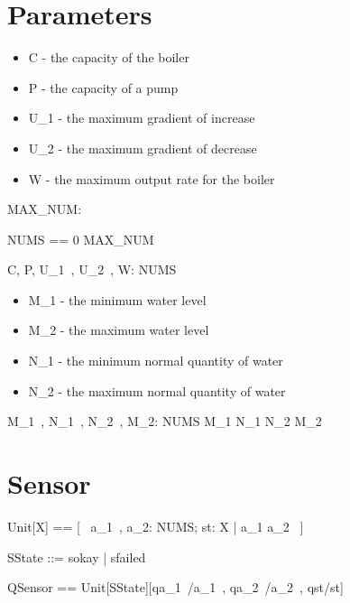 \documentclass{report} %
\begin{document}
\section{Parameters}
\begin{itemize}
    \item C - the capacity of the boiler
    \item P - the capacity of a pump 
    \item U\_1 - the maximum gradient of increase 
    \item U\_2 - the maximum gradient of decrease 
    \item W - the maximum output rate for the boiler 
\end{itemize}

\begin{axdef}
  MAX\_NUM: \nat
\end{axdef}

\begin{zed}
  NUMS == 0 \upto MAX\_NUM
\end{zed}

\begin{axdef}
  C, P, U\_1~, U\_2~, W: NUMS
\end{axdef}

\begin{itemize}
    \item M\_1 - the minimum water level  
    \item M\_2 - the maximum water level  
    \item N\_1 - the minimum normal quantity of water 
    \item N\_2 - the maximum normal quantity of water 
\end{itemize}
\begin{axdef}
  M\_1~, N\_1~, N\_2~, M\_2: NUMS
\where %
  M\_1 \leq N\_1 \leq N\_2 \leq M\_2
\end{axdef}

\section{Sensor}
\begin{zed}
  Unit[X] == [~ a\_1~, a\_2: NUMS; st: X | a\_1 \leq a\_2 ~]
\end{zed}

\begin{zed}
  SState ::= sokay | sfailed  \\
\end{zed}

\begin{zed}
  QSensor == Unit[SState][qa\_1~/a\_1~, qa\_2~/a\_2~, qst/st]
\end{zed}
\end{document}
